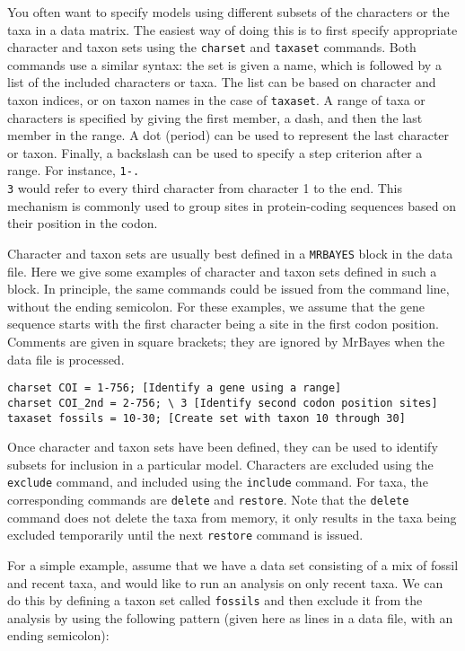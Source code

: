 \documentclass[12pt]{book}
\begin{document}
You often want to specify models using different subsets of the characters or the taxa in a data
matrix. The easiest way of doing this is to first specify appropriate character and taxon sets
using the \texttt{charset} and \texttt{taxaset} commands. Both commands use a similar syntax: the
set is given a name, which is followed by a list of the included characters or taxa. The list can
be based on character and taxon indices, or on taxon names in the case of \texttt{taxaset}. A range
of taxa or characters is specified by giving the first member, a dash, and then the last member in
the range.  A dot (period) can be used to represent the last character or taxon. Finally, a
backslash can be used to specify a step criterion after a range. For instance, \texttt{1-.\\3}
would refer to every third character from character 1 to the end. This mechanism is commonly used
to group sites in protein-coding sequences based on their position in the codon.

Character and taxon sets are usually best defined in a \texttt{MRBAYES} block in the data file.
Here we give some examples of character and taxon sets defined in such a block. In principle, the
same commands could be issued from the command line, without the ending semicolon. For these
examples, we assume that the gene sequence starts with the first character being a site in the
first codon position.  Comments are given in square brackets; they are ignored by MrBayes when the
data file is processed.

\begin{Verbatim}
charset COI = 1-756; [Identify a gene using a range]
charset COI_2nd = 2-756; \ 3 [Identify second codon position sites]
taxaset fossils = 10-30; [Create set with taxon 10 through 30]
\end{Verbatim}

Once character and taxon sets have been defined, they can be used to identify subsets for inclusion
in a particular model. Characters are excluded using the \texttt{exclude} command, and included
using the \texttt{include} command. For taxa, the corresponding commands are \texttt{delete} and
\texttt{restore}.  Note that the \texttt{delete} command does not delete the taxa from memory, it
only results in the taxa being excluded temporarily until the next \texttt{restore} command is
issued.

For a simple example, assume that we have a data set consisting of a mix of fossil and recent taxa,
and would like to run an analysis on only recent taxa. We can do this by defining a taxon set
called \texttt{fossils} and then exclude it from the analysis by using the following pattern (given
here as lines in a data file, with an ending semicolon):
\end{document}
